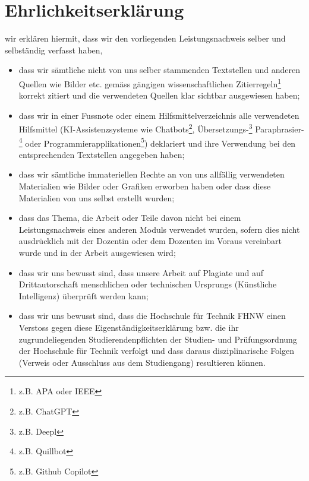 \section*{Ehrlichkeitserklärung}

wir erklären hiermit, dass wir den vorliegenden Leistungsnachweis selber und selbständig verfasst haben,
\begin{itemize} 
\item dass wir sämtliche nicht von uns selber stammenden Textstellen und anderen Quellen wie Bilder etc. gemäss gängigen wissenschaftlichen Zitierregeln\footnote{z.B. APA oder IEEE} korrekt zitiert und die verwendeten Quellen klar sichtbar ausgewiesen haben; 
\item dass wir in einer Fussnote oder einem Hilfsmittelverzeichnis alle verwendeten Hilfsmittel (KI-Assistenzsysteme wie Chatbots\footnote{z.B. ChatGPT}, Übersetzungs-\footnote{z.B. Deepl} Paraphrasier-\footnote{z.B. Quillbot} oder Programmierapplikationen\footnote{z.B. Github Copilot}) deklariert und ihre Verwendung bei den entsprechenden Textstellen angegeben haben;
\item dass wir sämtliche immateriellen Rechte an von uns allfällig verwendeten Materialien wie Bilder oder Grafiken erworben haben oder dass diese Materialien von uns selbst erstellt wurden;
\item dass das Thema, die Arbeit oder Teile davon nicht bei einem Leistungsnachweis eines anderen Moduls verwendet wurden, sofern dies nicht ausdrücklich mit der Dozentin oder dem Dozenten im Voraus vereinbart wurde und in der Arbeit ausgewiesen wird; 
\item dass wir uns bewusst sind, dass unsere Arbeit auf Plagiate und auf Drittautorschaft menschlichen oder technischen Ursprungs (Künstliche Intelligenz) überprüft werden kann;
\item dass wir uns bewusst sind, dass die Hochschule für Technik FHNW einen Verstoss gegen diese Eigenständigkeitserklärung bzw. die ihr zugrundeliegenden Studierendenpflichten der Studien- und Prüfungsordnung der Hochschule für Technik verfolgt und dass daraus disziplinarische Folgen (Verweis oder Ausschluss aus dem Studiengang) resultieren können.
\end{itemize}

\vspace{1cm}

